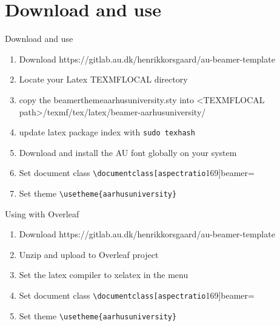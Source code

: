 \documentclass[aspectratio=169]{beamer}
\begin{document}
\section{Download and use}
\begin{frame}{Download and use}
\begin{enumerate}
    \item Download https://gitlab.au.dk/henrikkorsgaard/au-beamer-template
    \item Locate your Latex TEXMFLOCAL directory\footnotemark
    \item copy the beamerthemeaarhusuniversity.sty into  <TEXMFLOCAL path>/texmf/tex/latex/beamer-aarhusuniversity/
    \item update latex package index with \verb=sudo texhash=
    \item Download and install the AU font globally on your system
    \item Set document class \verb=\documentclass[aspectratio=169]{beamer}=
    \item Set theme \verb=\usetheme{aarhusuniversity}=
\end{enumerate}
\end{frame}

\begin{frame}{Using with Overleaf}
\begin{enumerate}
    \item Download https://gitlab.au.dk/henrikkorsgaard/au-beamer-template
    \item Unzip and upload to Overleaf project
    \item Set the latex compiler to xelatex in the menu
    \item Set document class \verb=\documentclass[aspectratio=169]{beamer}=
    \item Set theme \verb=\usetheme{aarhusuniversity}=
\end{enumerate}
\end{frame}
\end{document}
